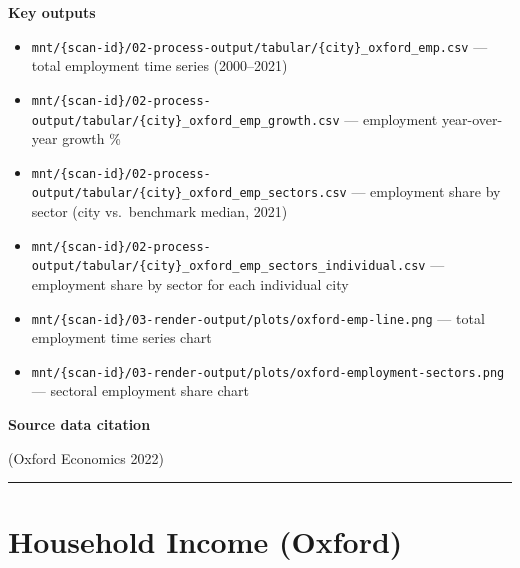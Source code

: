 \documentclass[
  letterpaper,
  DIV=11,
  numbers=noendperiod]{scrreprt}
\providecommand{\tightlist}{%
  \setlength{\itemsep}{0pt}\setlength{\parskip}{0pt}}
\begin{document}
\textbf{Key outputs}

\begin{itemize}
\tightlist
\item
  \texttt{mnt/\{scan-id\}/02-process-output/tabular/\{city\}\_oxford\_emp.csv}
  --- total employment time series (2000--2021)
\item
  \texttt{mnt/\{scan-id\}/02-process-output/tabular/\{city\}\_oxford\_emp\_growth.csv}
  --- employment year-over-year growth \%
\item
  \texttt{mnt/\{scan-id\}/02-process-output/tabular/\{city\}\_oxford\_emp\_sectors.csv}
  --- employment share by sector (city vs.~benchmark median, 2021)
\item
  \texttt{mnt/\{scan-id\}/02-process-output/tabular/\{city\}\_oxford\_emp\_sectors\_individual.csv}
  --- employment share by sector for each individual city
\item
  \texttt{mnt/\{scan-id\}/03-render-output/plots/oxford-emp-line.png}
  --- total employment time series chart
\item
  \texttt{mnt/\{scan-id\}/03-render-output/plots/oxford-employment-sectors.png}
  --- sectoral employment share chart
\end{itemize}

\textbf{Source data citation}

(Oxford Economics 2022)

\begin{center}\rule{0.5\linewidth}{0.5pt}\end{center}

\section{Household Income (Oxford)}\label{household-income-oxford}
\end{document}
